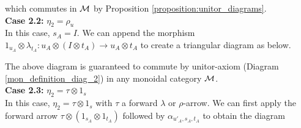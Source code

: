 \begin{varprf}
\begin{center}
    \end{center}
    which commutes in $\mathcal{M}$ by Proposition \ref{proposition:unitor_diagrams}.
    \\
    \textbf{Case 2.2:} $\eta_2 = \rho_u$\\
    In this case, $s_A = I$. We can append the morphism 
    $1_{u_A} \otimes \lambda_{t_A}: u_A \otimes (I \otimes t_A) \to u_A \otimes t_A$ 
    to create a triangular diagram as below. 
    \begin{center}
    \end{center}
    The above diagram is guaranteed to commute by unitor-axiom (Diagram \ref{mon_definition_diag_2})
    in any monoidal category $\mathcal{M}$.
    \\
    \textbf{Case 2.3:} $\eta_2 = \tau \otimes 1_s$\\
    In this case, $\eta_2 = \tau \otimes 1_s$ with $\tau$ a forward $\lambda$ 
    or $\rho$-arrow.
    We can first apply the forward arrow $\tau \otimes (1_{s_A} \otimes 1_{t_A})$
    followed by $\alpha_{u'_A, s_A, t_A}$ to obtain the diagram 
    \begin{center}
\end{center}
\end{varprf}
